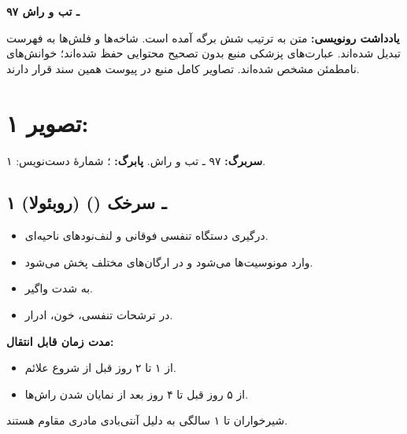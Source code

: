 \documentclass[12pt,a4paper]{article}
\begin{document}
\fi
\providecommand{\FRunclear}[1]{\textbf{[خوانش نامطمئن: #1]}}
\providecommand{\FRmath}[1]{\lr{\(#1\)}}
\providecommand{\FRpage}[2]{\clearpage\section*{تصویر #1: \lr{pic#2.jpg}}%
  \textbf{سربرگ:} ۹۷ ـ تب و راش. \textbf{پابرگ:} \lr{GNOTE}؛ شمارهٔ دست‌نویس: #1.\par}

\begin{center}
{\Large\bfseries ۹۷ ـ تب و راش}\\
\end{center}
\textbf{یادداشت رونویسی:} متن به ترتیب شش برگه آمده است. شاخه‌ها و فلش‌ها به فهرست تبدیل شده‌اند. عبارت‌های پزشکی منبع بدون تصحیح محتوایی حفظ شده‌اند؛ خوانش‌های نامطمئن مشخص شده‌اند. تصاویر کامل منبع در پیوست همین سند قرار دارند.

\FRpage{۱}{01}
\subsection*{۱ ـ سرخک () (روبئولا)}
\begin{itemize}
\item درگیری دستگاه تنفسی فوقانی و لنف‌نودهای ناحیه‌ای.
\item وارد مونوسیت‌ها می‌شود و در ارگان‌های مختلف پخش می‌شود.
\item به شدت واگیر.
\item در ترشحات تنفسی، خون، ادرار.
\end{itemize}
\textbf{مدت زمان قابل انتقال:}
\begin{itemize}
\item از ۱ تا ۲ روز قبل از شروع علائم.
\item از ۵ روز قبل تا ۴ روز بعد از نمایان شدن راش‌ها.
\end{itemize}
شیرخواران تا ۱ سالگی به دلیل آنتی‌بادی مادری مقاوم هستند.
\end{document}
